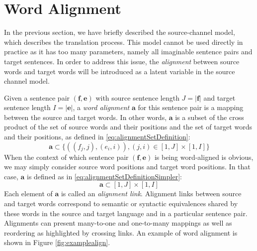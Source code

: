 \section{Word Alignment}
\label{sec:StatisticalMachineTranslationWordAlignment}

In the previous section, we have briefly described the source-channel model, which
describes the translation process. This model cannot be used directly in
practice as it has too many parameters, namely all imaginable
sentence pairs and target sentences. In order to address this issue,
the \emph{alignment} between source words and target words will be
introduced as a latent variable in the source channel model.

Given a sentence pair $(\bm{f}, \bm{e})$ with source sentence
length $J = |\bm{f}|$ and target sentence
length $I = |\bm{e}|$, a \emph{word alignment} $\bm{a}$
for this sentence pair is a mapping between the source and target
words. In other words, $\bm{a}$ is a subset of the cross product
of the set of source words and their positions and the set of target
words and their positions, as defined in \autoref{eq:alignmentSetDefinition}:
%
\begin{equation}
  \bm{a} \subset \{((f_j, j), (e_i, i)), (j, i) \in [1, J] \times [1, I]\}
  \label{eq:alignmentSetDefinition}
\end{equation}
%
When the context of which sentence pair $(\bm{f}, \bm{e})$ is
being word-aligned is obvious, we may simply consider source word positions
and target word positions. In that case, $\bm{a}$ is defined as in
\autoref{eq:alignmentSetDefinitionSimpler}:
%
\begin{equation}
  \bm{a} \subset [1, J] \times [1, I]
  \label{eq:alignmentSetDefinitionSimpler}
\end{equation}
%
Each element of $\bm{a}$ is called an \emph{alignment link}.
Alignment links between source and target words
correspond to semantic or syntactic equivalences shared by these words in the
source and target language and in a particular
sentence pair. Alignments can present many-to-one and one-to-many
mappings as well as reordering as highlighted by crossing links. An example
of word alignment is
shown in Figure \ref{fig:examplealign}.
%
